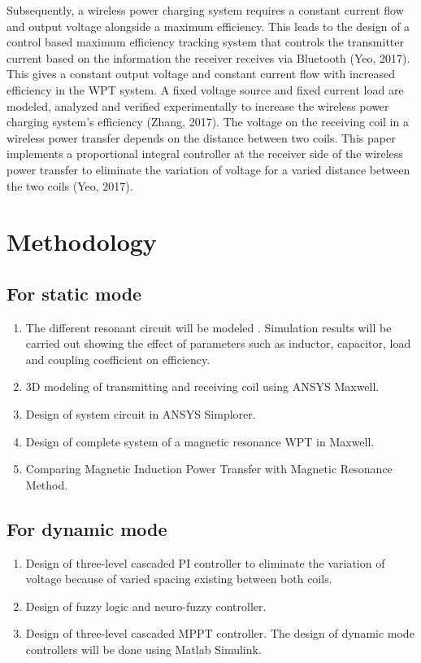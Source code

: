 \documentclass[12pt]{article}
\begin{document}
Subsequently, a wireless power charging system requires a constant current flow and output
voltage alongside a maximum efficiency. This leads to the design of a control based maximum
efficiency tracking system that controls the transmitter current based on the information the receiver
receives via Bluetooth (Yeo, 2017). This gives a constant output voltage and constant current flow
with increased efficiency in the WPT system. A fixed voltage source and fixed current load are
modeled, analyzed and verified experimentally to increase the wireless power charging system's 
efficiency (Zhang, 2017). The voltage on the receiving coil in a wireless power transfer depends on the
distance between two coils. This paper implements a proportional integral controller at the receiver
side of the wireless power transfer to eliminate the variation of voltage for a varied distance between
the two coils (Yeo, 2017). \cite{a2019}

\section{Methodology}
\subsection{For static mode}
\begin{enumerate}
	\item The different resonant circuit will be modeled . Simulation results will be carried out showing the effect of parameters such as inductor, capacitor, load and coupling coefficient on efficiency. 
	\item 3D modeling of transmitting and receiving coil using ANSYS Maxwell. 
	\item Design of system circuit in ANSYS Simplorer. 
	\item Design of complete system of a magnetic resonance WPT in Maxwell. 
	\item Comparing Magnetic Induction Power Transfer with Magnetic Resonance Method. 
\end{enumerate}

\subsection{For dynamic mode}
\begin{enumerate}
	\item Design of three-level cascaded PI controller  to eliminate the variation of voltage because of varied spacing existing between both coils.
	\item Design of fuzzy logic and neuro-fuzzy controller.
	\item Design of three-level cascaded MPPT controller. 
		The design of dynamic mode controllers will be done using Matlab Simulink. 
\end{enumerate}
\newpage
\end{document}
